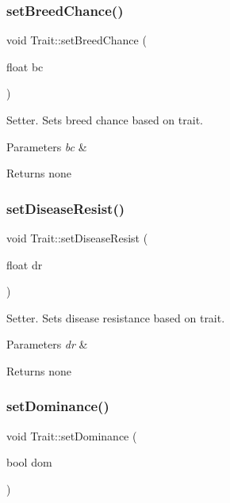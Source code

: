 \subsubsection{\texorpdfstring{set\+Breed\+Chance()}{setBreedChance()}}
{\footnotesize\ttfamily void Trait\+::set\+Breed\+Chance (\begin{DoxyParamCaption}\item[{float}]{bc }\end{DoxyParamCaption})}

Setter. Sets breed chance based on trait. 
\begin{DoxyParams}{Parameters}
{\em bc} & \\
\hline
\end{DoxyParams}
\begin{DoxyReturn}{Returns}
none 
\end{DoxyReturn}
\mbox{\label{class_trait_afd78c8d97e46ea8ba6b8240034419b1b}} 
\subsubsection{\texorpdfstring{set\+Disease\+Resist()}{setDiseaseResist()}}
{\footnotesize\ttfamily void Trait\+::set\+Disease\+Resist (\begin{DoxyParamCaption}\item[{float}]{dr }\end{DoxyParamCaption})}

Setter. Sets disease resistance based on trait. 
\begin{DoxyParams}{Parameters}
{\em dr} & \\
\hline
\end{DoxyParams}
\begin{DoxyReturn}{Returns}
none 
\end{DoxyReturn}
\mbox{\label{class_trait_aa8b92de8273b52045e4a545e2bbd4075}} 
\subsubsection{\texorpdfstring{set\+Dominance()}{setDominance()}}
{\footnotesize\ttfamily void Trait\+::set\+Dominance (\begin{DoxyParamCaption}\item[{bool}]{dom }\end{DoxyParamCaption})}

